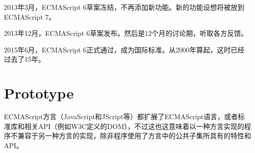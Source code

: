 2013年3月，ECMAScript 6草案冻结，不再添加新功能。新的功能设想将被放到ECMAScript 7。

2013年12月，ECMAScript 6草案发布。然后是12个月的讨论期，听取各方反馈。

2015年6月，ECMAScript 6正式通过，成为国际标准。从2000年算起，这时已经过去了15年。





\chapter{Prototype}

ECMAScript方言（JavaScript和JScript等）都扩展了ECMAScript语言，或者标准库和相关API（例如W3C定义的DOM），不过这也这意味着以一种方言实现的程序不兼容于另一种方言的实现，除非程序使用了方言中的公共子集所具有的特性和API。






